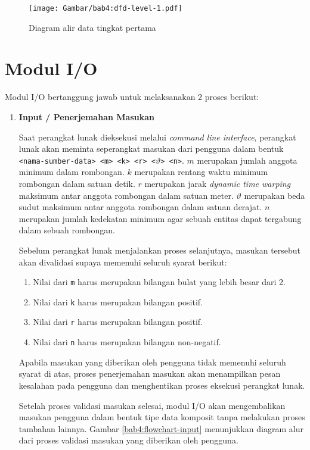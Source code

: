\begin{figure}[t]
    \centering
    \texttt{[image: Gambar/bab4:dfd-level-1.pdf]}
    \caption{Diagram alir data tingkat pertama}
    \label{bab4:dfd-level-1}
\end{figure}

\section{Modul I/O}
\label{sec:des-io}

Modul I/O bertanggung jawab untuk melaksanakan 2 proses berikut:

\begin{enumerate}
    \item \textbf{Input / Penerjemahan Masukan}
    
    Saat perangkat lunak dieksekusi melalui \textit{command line interface}, perangkat lunak akan meminta seperangkat masukan dari pengguna dalam bentuk \texttt{<nama-sumber-data> <m> <k> <r> <$\vartheta$> <n>}. $m$ merupakan jumlah anggota minimum dalam rombongan. $k$ merupakan rentang waktu minimum rombongan dalam satuan detik. $r$ merupakan jarak \textit{dynamic time warping} maksimum antar anggota rombongan dalam satuan meter. $\vartheta$ merupakan beda sudut maksimum antar anggota rombongan dalam satuan derajat. $n$ merupakan jumlah kedekatan minimum agar sebuah entitas dapat tergabung dalam sebuah rombongan.
    
    Sebelum perangkat lunak menjalankan proses selanjutnya, masukan tersebut akan divalidasi supaya memenuhi seluruh syarat berikut:
    
    \begin{enumerate}
        \item Nilai dari \texttt{m} harus merupakan bilangan bulat yang lebih besar dari 2.
        \item Nilai dari \texttt{k} harus merupakan bilangan positif.
        \item Nilai dari \texttt{r} harus merupakan bilangan positif.
        \item Nilai dari \texttt{n} harus merupakan bilangan non-negatif.
    \end{enumerate}
    
    Apabila masukan yang diberikan oleh pengguna tidak memenuhi seluruh syarat di atas, proses penerjemahan masukan akan menampilkan pesan kesalahan pada pengguna dan menghentikan proses eksekusi perangkat lunak.
    
    Setelah proses validasi masukan selesai, modul I/O akan mengembalikan masukan pengguna dalam bentuk tipe data komposit tanpa melakukan proses tambahan lainnya. Gambar \ref{bab4:flowchart-input} menunjukkan diagram alur dari proses validasi masukan yang diberikan oleh pengguna.
    

\end{enumerate}

